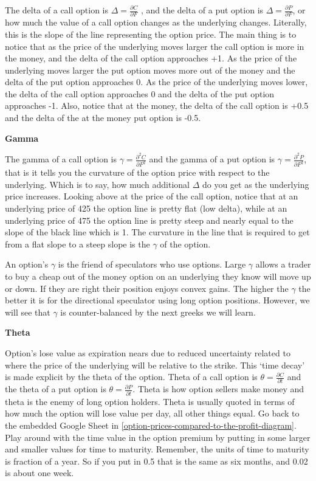 \documentclass[
]{book}
\begin{document}
The delta of a call option is \(\Delta = \frac{\partial C}{\partial F}\) , and the delta of a put option is \(\Delta = \frac{\partial P}{\partial F}\), or how much the value of a call option changes as the underlying changes. Literally, this is the slope of the line representing the option price. The main thing is to notice that as the price of the underlying moves larger the call option is more in the money, and the delta of the call option approaches +1. As the price of the underlying moves larger the put option moves more out of the money and the delta of the put option approaches 0. As the price of the underlying moves lower, the delta of the call option approaches 0 and the delta of the put option approaches -1. Also, notice that at the money, the delta of the call option is +0.5 and the delta of the at the money put option is -0.5.

\textbf{Gamma}

The gamma of a call option is \(\gamma = \frac{\partial^2 C}{\partial F^2}\) and the gamma of a put option is \(\gamma = \frac{\partial^2 P}{\partial F^2}\), that is it tells you the curvature of the option price with respect to the underlying. Which is to say, how much additional \(\Delta\) do you get as the underlying price increases. Looking above at the price of the call option, notice that at an underlying price of 425 the option line is pretty flat (low delta), while at an underlying price of 475 the option line is pretty steep and nearly equal to the slope of the black line which is 1. The curvature in the line that is required to get from a flat slope to a steep slope is the \(\gamma\) of the option.

An option's \(\gamma\) is the friend of speculators who use options. Large \(\gamma\) allows a trader to buy a cheap out of the money option on an underlying they know will move up or down. If they are right their position enjoys convex gains. The higher the \(\gamma\) the better it is for the directional speculator using long option positions. However, we will see that \(\gamma\) is counter-balanced by the next greeks we will learn.

\textbf{Theta}

Option's lose value as expiration nears due to reduced uncertainty related to where the price of the underlying will be relative to the strike. This `time decay' is made explicit by the theta of the option. Theta of a call option is \(\theta = \frac{\partial C}{\partial t}\) and the theta of a put option is \(\theta = \frac{\partial P}{\partial t}\). Theta is how option sellers make money and theta is the enemy of long option holders. Theta is usually quoted in terms of how much the option will lose value per day, all other things equal. Go back to the embedded Google Sheet in \ref{option-prices-compared-to-the-profit-diagram}. Play around with the time value in the option premium by putting in some larger and smaller values for time to maturity. Remember, the units of time to maturity is fraction of a year. So if you put in 0.5 that is the same as six months, and 0.02 is about one week.
\end{document}
